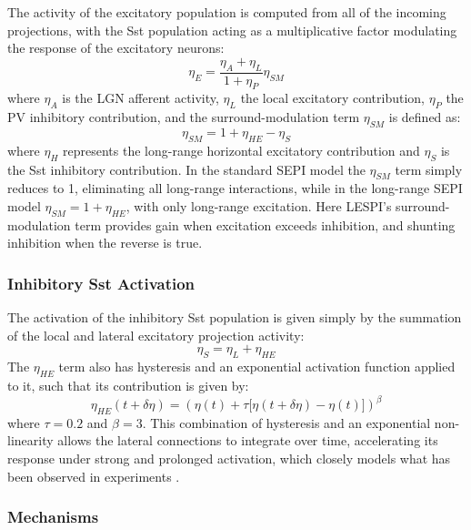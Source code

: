 The activity of the excitatory population is computed from all of the
incoming projections, with the Sst population acting as a
multiplicative factor modulating the response of the excitatory
neurons:
\begin{equation}
  \eta_{E} = \frac{\eta_{A} + \eta_{L}}{1 + \eta_{P}} \eta_{SM}
\end{equation}
where $\eta_{A}$ is the LGN afferent activity, $\eta_{L}$ the local
excitatory contribution, $\eta_{P}$ the PV inhibitory contribution,
and the surround-modulation term $\eta_{SM}$ is defined as:
\begin{equation}
  \eta_{SM} = 1 + \eta_{HE} - \eta_{S}
\end{equation}
where $\eta_{H}$ represents the long-range horizontal excitatory
contribution and $\eta_{S}$ is the Sst inhibitory contribution.  In
the standard SEPI model the $\eta_{SM}$ term simply reduces to 1,
eliminating all long-range interactions, while in the long-range SEPI
model $\eta_{SM} = 1 + \eta_{HE}$, with only long-range excitation.
Here LESPI's surround-modulation term provides gain when excitation
exceeds inhibition, and shunting inhibition when the reverse is true.

\subsubsection*{Inhibitory Sst Activation}

The activation of the inhibitory Sst population is given simply by the
summation of the local and lateral excitatory projection activity:
\begin{equation}
  \eta_{S} = \eta_{L} + \eta_{HE}
\end{equation}
The $\eta_{HE}$ term also has hysteresis and an
exponential activation function applied to it, such that its
contribution is given by:
\begin{equation}
  \eta_{HE} (t + \delta\eta) = (\eta(t) + \tau \big[ \eta(t+\delta\eta) - \eta(t) \big])^\beta
\end{equation}
where $\tau=0.2$ and $\beta=3$. This combination of hysteresis and an
exponential non-linearity allows the lateral connections to integrate
over time, accelerating its response under strong and prolonged
activation, which closely models what has been observed in experiments
\citep{Beierlein2003,Bartley2008,Tan2008}.

\subsubsection*{Mechanisms}


